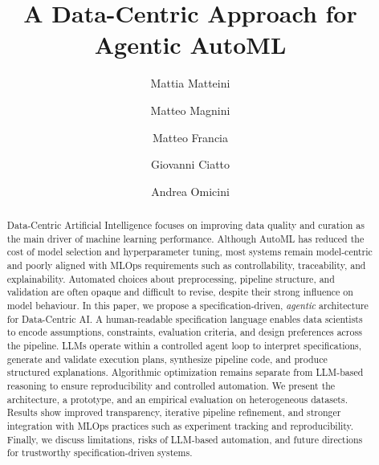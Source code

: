 \documentclass[runningheads]{llncs}
\begin{document}
%
\title{A Data-Centric Approach for Agentic \acs{AutoML}}
%
%
\author{
Mattia Matteini \and
Matteo Magnini \and
Matteo Francia \and
Giovanni Ciatto \and
Andrea Omicini
}
%
%
%
\maketitle              %
%
\begin{abstract}
Data-Centric Artificial Intelligence focuses on improving data quality and curation as the main driver of machine learning performance.
%
Although \ac{AutoML} has reduced the cost of model selection and hyperparameter tuning,
most systems remain model-centric and poorly aligned with \ac{MLOps} requirements such as controllability, traceability, and explainability.
%
Automated choices about preprocessing, pipeline structure, and validation are often opaque and difficult to revise, despite their strong influence on model behaviour.
%
In this paper, we propose a specification-driven, \textit{agentic} architecture for Data-Centric AI.
%
A human-readable specification language enables data scientists to encode assumptions, constraints, evaluation criteria, and design preferences across the pipeline.
%
\acp{LLM} operate within a controlled agent loop to interpret specifications, generate and validate execution plans, synthesize pipeline code, and produce structured explanations.
%
Algorithmic optimization remains separate from \ac{LLM}-based reasoning to ensure reproducibility and controlled automation.
%
We present the architecture, a prototype, and an empirical evaluation on heterogeneous datasets.
%
Results show improved transparency, iterative pipeline refinement, and stronger integration with \ac{MLOps} practices such as experiment tracking and reproducibility.
%
Finally, we discuss limitations, risks of \ac{LLM}-based automation, and future directions for trustworthy specification-driven systems.

\end{abstract}
%
%
%
\end{document}
